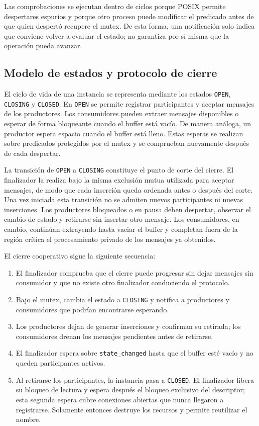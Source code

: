 \documentclass[conference]{IEEEtran}
\begin{document}
Las comprobaciones se ejecutan dentro de ciclos porque POSIX permite despertares espurios y porque otro proceso puede modificar el predicado antes de que quien despertó recupere el mutex. De esta forma, una notificación solo indica que conviene volver a evaluar el estado; no garantiza por sí misma que la operación pueda avanzar.

\subsection{Modelo de estados y protocolo de cierre}
El ciclo de vida de una instancia se representa mediante los estados \texttt{OPEN}, \texttt{CLOSING} y \texttt{CLOSED}. En \texttt{OPEN} se permite registrar participantes y aceptar mensajes de los productores. Los consumidores pueden extraer mensajes disponibles o esperar de forma bloqueante cuando el buffer está vacío. De manera análoga, un productor espera espacio cuando el buffer está lleno. Estas esperas se realizan sobre predicados protegidos por el mutex y se comprueban nuevamente después de cada despertar.

La transición de \texttt{OPEN} a \texttt{CLOSING} constituye el punto de corte del cierre. El finalizador la realiza bajo la misma exclusión mutua utilizada para aceptar mensajes, de modo que cada inserción queda ordenada antes o después del corte. Una vez iniciada esta transición no se admiten nuevos participantes ni nuevas inserciones. Los productores bloqueados o en pausa deben despertar, observar el cambio de estado y retirarse sin insertar otro mensaje. Los consumidores, en cambio, continúan extrayendo hasta vaciar el buffer y completan fuera de la región crítica el procesamiento privado de los mensajes ya obtenidos.

El cierre cooperativo sigue la siguiente secuencia:
\begin{enumerate}
\item El finalizador comprueba que el cierre puede progresar sin dejar mensajes sin consumidor y que no existe otro finalizador conduciendo el protocolo.
\item Bajo el mutex, cambia el estado a \texttt{CLOSING} y notifica a productores y consumidores que podrían encontrarse esperando.
\item Los productores dejan de generar inserciones y confirman su retirada; los consumidores drenan los mensajes pendientes antes de retirarse.
\item El finalizador espera sobre \texttt{state\_changed} hasta que el buffer esté vacío y no queden participantes activos.
\item Al retirarse los participantes, la instancia pasa a \texttt{CLOSED}. El finalizador libera su bloqueo de lectura y espera después el bloqueo exclusivo del descriptor; esta segunda espera cubre conexiones abiertas que nunca llegaron a registrarse. Solamente entonces destruye los recursos y permite reutilizar el nombre.
\end{enumerate}
\end{document}
